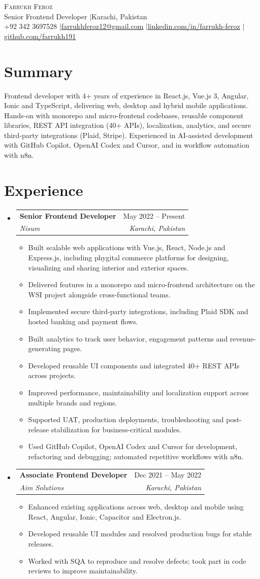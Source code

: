 \documentclass[letterpaper,10.5pt]{article}
\makeatletter
\newcommand{\resumeItem}[1]{\item\small{#1\vspace{-2pt}}}
\newcommand{\resumeSubheading}[4]{\vspace{-2pt}\item\begin{tabular*}{0.97\textwidth}[t]{l@{\extracolsep{\fill}}r}\textbf{#1}&#2\\\textit{\small#3}&\textit{\small#4}\\\end{tabular*}\vspace{-7pt}}
\newcommand{\resumeSubHeadingListStart}{\begin{itemize}[leftmargin=0.15in,label={}]}
\newcommand{\resumeSubHeadingListEnd}{\end{itemize}}
\newcommand{\resumeItemListStart}{\begin{itemize}[leftmargin=0.18in]}
\newcommand{\resumeItemListEnd}{\end{itemize}\vspace{-5pt}}
\makeatother
\begin{document}
\begin{center}
{\Huge \scshape Farrukh Feroz}\\\vspace{3pt}
\small Senior Frontend Developer \quad$|$\quad Karachi, Pakistan\\\vspace{2pt}
\small +92 342 3697528 \quad$|$\quad \href{mailto:farrukhferoz12@gmail.com}{\underline{farrukhferoz12@gmail.com}} \quad$|$\quad \href{https://www.linkedin.com/in/farrukh-feroz}{\underline{linkedin.com/in/farrukh-feroz}} \quad$|$\quad \href{https://github.com/farrukh191}{\underline{github.com/farrukh191}}
\end{center}

\section{Summary}
\small Frontend developer with 4+ years of experience in React.js, Vue.js 3, Angular, Ionic and TypeScript, delivering web, desktop and hybrid mobile applications. Hands-on with monorepo and micro-frontend codebases, reusable component libraries, REST API integration (40+ APIs), localization, analytics, and secure third-party integrations (Plaid, Stripe). Experienced in AI-assisted development with GitHub Copilot, OpenAI Codex and Cursor, and in workflow automation with n8n.

\section{Experience}
\resumeSubHeadingListStart
\resumeSubheading{Senior Frontend Developer}{May 2022 -- Present}{Nisum}{Karachi, Pakistan}
\resumeItemListStart
\resumeItem{Built scalable web applications with Vue.js, React, Node.js and Express.js, including phygital commerce platforms for designing, visualizing and sharing interior and exterior spaces.}
\resumeItem{Delivered features in a monorepo and micro-frontend architecture on the WSI project alongside cross-functional teams.}
\resumeItem{Implemented secure third-party integrations, including Plaid SDK and hosted banking and payment flows.}
\resumeItem{Built analytics to track user behavior, engagement patterns and revenue-generating pages.}
\resumeItem{Developed reusable UI components and integrated 40+ REST APIs across projects.}
\resumeItem{Improved performance, maintainability and localization support across multiple brands and regions.}
\resumeItem{Supported UAT, production deployments, troubleshooting and post-release stabilization for business-critical modules.}
\resumeItem{Used GitHub Copilot, OpenAI Codex and Cursor for development, refactoring and debugging; automated repetitive workflows with n8n.}
\resumeItemListEnd
\resumeSubheading{Associate Frontend Developer}{Dec 2021 -- May 2022}{Aim Solutions}{Karachi, Pakistan}
\resumeItemListStart
\resumeItem{Enhanced existing applications across web, desktop and mobile using React, Angular, Ionic, Capacitor and Electron.js.}
\resumeItem{Developed reusable UI modules and resolved production bugs for stable releases.}
\resumeItem{Worked with SQA to reproduce and resolve defects; took part in code reviews to improve maintainability.}
\resumeItemListEnd
\resumeSubHeadingListEnd
\end{document}

